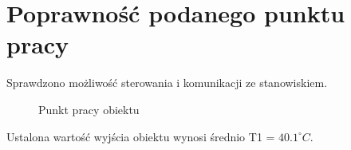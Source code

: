 \section{Poprawność podanego punktu pracy}
\label{lab:zad1}

Sprawdzono możliwość sterowania i komunikacji ze stanowiskiem.


\begin{figure}[H] 
   \centering
   
   \caption{Punkt pracy obiektu}
   \label{lab:zad1:figure}
\end{figure}

Ustalona wartość wyjścia obiektu wynosi średnio T1 = $\num{40.1}^{\circ} C$.

\newpage
